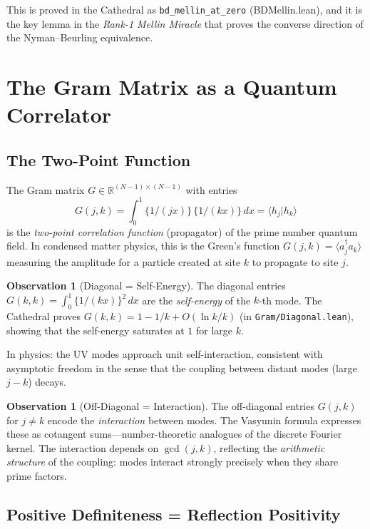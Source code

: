 \documentclass[11pt,a4paper]{article}
\theoremstyle{definition}
\newtheorem{observation}[definition]{Observation}
\newcommand{\RR}{\mathbb{R}}
\newcommand{\fract}[1]{\{#1\}}
\newcommand{\lean}[1]{\texttt{#1}}
\newcommand{\braket}[2]{\langle #1 | #2 \rangle}
\newcommand{\expect}[1]{\langle #1 \rangle}
\begin{document}
This is proved in the Cathedral as \lean{bd\_mellin\_at\_zero} (BDMellin.lean),
and it is the key lemma in the \emph{Rank-1 Mellin Miracle} that proves
the converse direction of the Nyman--Beurling equivalence.

\section{The Gram Matrix as a Quantum Correlator}

\subsection{The Two-Point Function}

The Gram matrix $G \in \RR^{(N-1) \times (N-1)}$ with entries
\[
  G(j,k) = \int_0^1 \fract{1/(jx)}\,\fract{1/(kx)}\,dx
  = \braket{h_j}{h_k}
\]
is the \emph{two-point correlation function} (propagator) of the
prime number quantum field. In condensed matter physics, this is the
Green's function $G(j,k) = \expect{a_j^\dagger a_k}$ measuring the
amplitude for a particle created at site $k$ to propagate to site $j$.

\begin{observation}[Diagonal = Self-Energy]
The diagonal entries $G(k,k) = \int_0^1 \fract{1/(kx)}^2\,dx$ are
the \emph{self-energy} of the $k$-th mode. The Cathedral proves
$G(k,k) = 1 - 1/k + O(\ln k / k)$ (in \lean{Gram/Diagonal.lean}),
showing that the self-energy saturates at $1$ for large $k$.

In physics: the UV modes approach unit self-interaction, consistent
with asymptotic freedom in the sense that the coupling between
distant modes (large $j-k$) decays.
\end{observation}

\begin{observation}[Off-Diagonal = Interaction]
The off-diagonal entries $G(j,k)$ for $j \neq k$ encode the
\emph{interaction} between modes. The Vasyunin formula expresses these
as cotangent sums---number-theoretic analogues of the discrete Fourier
kernel. The interaction depends on $\gcd(j,k)$, reflecting the
\emph{arithmetic structure} of the coupling: modes interact strongly
precisely when they share prime factors.
\end{observation}

\subsection{Positive Definiteness = Reflection Positivity}
\end{document}
